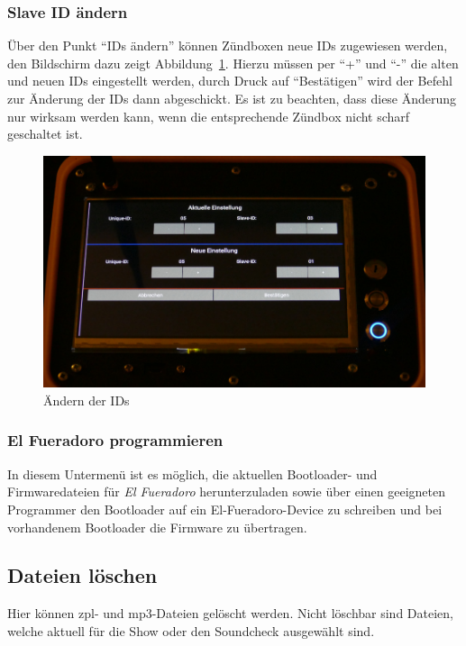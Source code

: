 \documentclass[paper=a4, parskip, numbers=noenddot, toc=listof, headsepline]{scrbook}
\newcommand{\anlage}{\emph{El Fueradoro}}
\begin{document}
				\subsubsection{Slave ID ändern}

					Über den Punkt \enquote{IDs ändern} können Zündboxen neue IDs zugewiesen werden, den Bildschirm dazu zeigt Abbildung~\ref{fig:REFids}. Hierzu müssen per \enquote{+} und \enquote{-} die alten und neuen IDs eingestellt werden, durch Druck auf \enquote{Bestätigen} wird der Befehl zur Änderung der IDs dann abgeschickt. Es ist zu beachten, dass diese Änderung nur wirksam werden kann, wenn die entsprechende Zündbox nicht scharf geschaltet ist.

					\begin{figure}
						\centering\includegraphics[width=150mm]{Bilder/REFids}
						\caption{Ändern der IDs}
						\label{fig:REFids}
					\end{figure}
				
				\subsubsection{El Fueradoro programmieren}
					
					In diesem Untermenü ist es möglich, die aktuellen Bootloader- und Firmwaredateien für \anlage{} herunterzuladen sowie über einen geeigneten Programmer den Bootloader auf ein El-Fueradoro-Device zu schreiben und bei vorhandenem Bootloader die Firmware zu übertragen.
					
			    \subsection{Dateien löschen}
			    
			        Hier können zpl- und mp3-Dateien gelöscht werden. Nicht löschbar sind Dateien, welche aktuell für die Show oder den Soundcheck ausgewählt sind.
\end{document}
